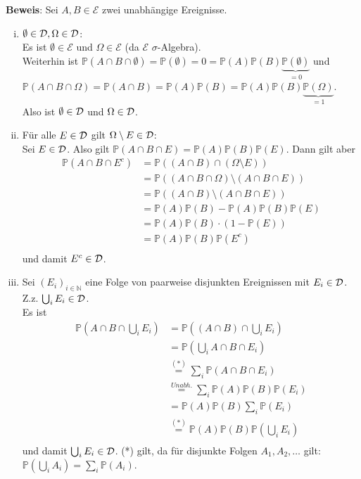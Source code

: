 \documentclass[11pt,a4paper,ngerman]{article}
\newcommand{\Prob}{\mathbb{P}}
\newcommand{\Epsilon}{\mathcal{E}}
\begin{document}
\textbf{Beweis}: Sei  $A,B \in \Epsilon$ zwei unabhängige Ereignisse.
\begin{enumerate}[(i)]
\item $\emptyset \in \mathcal{D}, \Omega \in \mathcal{D}$: \\
Es ist $\emptyset \in \Epsilon$ und $\Omega \in \Epsilon$ (da $\Epsilon$ $\sigma$-Algebra). \\
Weiterhin ist $\Prob(A \cap B \cap \emptyset) = \Prob(\emptyset) = 0 = \Prob(A) \Prob(B) \underbrace{\Prob(\emptyset)}_{=0}$ und \\
$\Prob(A \cap B \cap \Omega) = \Prob(A \cap B) = \Prob(A) \Prob(B) =  \Prob(A) \Prob(B) \underbrace{\Prob(\Omega)}_{=1}$. \\
Also ist $\emptyset \in \mathcal{D}$ und $\Omega \in \mathcal{D}$.
\item Für alle $E \in \mathcal{D}$ gilt  $\Omega \setminus E \in \mathcal{D}$: \\
Sei $E \in \mathcal{D}$. Also gilt $\Prob(A \cap B \cap E) = \Prob(A) \Prob(B) \Prob(E)$. Dann gilt aber
\begin{equation*}\begin{split}
 \Prob(A \cap B \cap E^c) &=  \Prob((A \cap B) \cap (\Omega \setminus E)) \\
&=  \Prob((A \cap B \cap \Omega) \setminus (A \cap B \cap E)) \\
&= \Prob((A \cap B) \setminus (A \cap B \cap E)) \\
&=  \Prob(A)\Prob(B) - \Prob(A)\Prob(B)\Prob(E) \\
&= \Prob(A)\Prob(B) \cdot (1 - \Prob(E)) \\
&= \Prob(A)\Prob(B) \Prob(E^c) \\
\end{split}\end{equation*}
und damit $E^c \in \mathcal{D}$.
\item Sei $\left( E_i \right)_{i \in \mathbb{N}}$ eine Folge von paarweise disjunkten Ereignissen mit $E_i \in \mathcal{D}$. \\
Z.z. $\bigcup_i E_i \in \mathcal{D}$. \\
Es ist
\begin{equation*}\begin{split}
 \Prob(A \cap B \cap \bigcup_i E_i) &=  \Prob((A \cap B) \cap \bigcup_i E_i) \\
&= \Prob(\bigcup_i A \cap B \cap E_i) \\
&\stackrel{(*)}{=} \sum_i \Prob(A \cap B \cap E_i) \\
&\stackrel{Unabh.}{=} \sum_i \Prob(A) \Prob(B) \Prob(E_i) \\
&= \Prob(A)\Prob(B) \sum_i \Prob(E_i) \\
&\stackrel{(*)}{=} \Prob(A)\Prob(B) \Prob(\bigcup_i E_i) \\
\end{split}\end{equation*}
und damit $\bigcup_i E_i \in \mathcal{D}$.
(*) gilt, da für disjunkte Folgen $A_1, A_2, \ldots$ gilt: $\Prob(\bigcup_i A_i) = \sum_i \Prob(A_i)$.
\end{enumerate}
\end{document}
